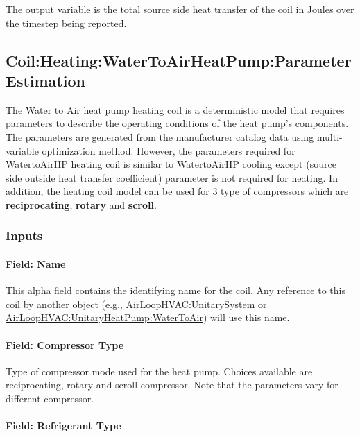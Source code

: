 The output variable is the total source side heat transfer of the coil in Joules over the timestep being reported.

\subsection{Coil:Heating:WaterToAirHeatPump:ParameterEstimation}\label{coilheatingwatertoairheatpumpparameterestimation}

The Water to Air heat pump heating coil is a deterministic model that requires parameters to describe the operating conditions of the heat pump's components. The parameters are generated from the manufacturer catalog data using multi-variable optimization method. However, the parameters required for WatertoAirHP heating coil is similar to WatertoAirHP cooling except (source side outside heat transfer coefficient) parameter is not required for heating. In addition, the heating coil model can be used for 3 type of compressors which are \textbf{reciprocating}, \textbf{rotary} and \textbf{scroll}.

\subsubsection{Inputs}\label{inputs-32}

\paragraph{Field: Name}\label{field-name-31}

This alpha field contains the identifying name for the coil. Any reference to this coil by another object (e.g., \hyperref[airloophvacunitarysystem]{AirLoopHVAC:UnitarySystem} or \hyperref[airloophvacunitaryheatpumpwatertoair]{AirLoopHVAC:UnitaryHeatPump:WaterToAir}) will use this name.

\paragraph{Field: Compressor Type}\label{field-compressor-type-1}

Type of compressor mode used for the heat pump. Choices available are reciprocating, rotary and scroll compressor. Note that the parameters vary for different compressor.

\paragraph{Field: Refrigerant Type}\label{field-refrigerant-type-1}

